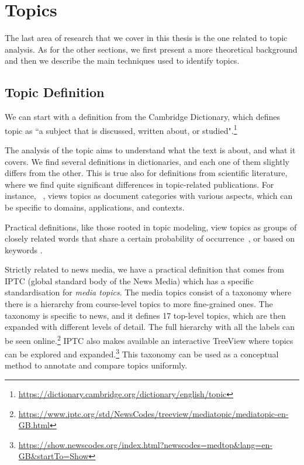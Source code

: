 \section{\statusgreen Topics}
\label{sec:lit_topics}

The last area of research that we cover in this thesis is the one related to topic analysis.
As for the other sections, we first present a more theoretical background and then we describe the main techniques used to identify topics.


\subsection{\statusgreen Topic Definition}
\label{sec:lit_topics_def}

We can start with a definition from the Cambridge Dictionary, which defines topic as ``a subject that is discussed, written about, or studied".\footnote{\url{https://dictionary.cambridge.org/dictionary/english/topic}}

The analysis of the topic aims to understand what the text is about, and what it covers. We find several definitions in dictionaries, and each one of them slightly differs from the other.
This is true also for definitions from scientific literature, where we find quite significant differences in topic-related publications.
For instance, %
~\citet{ding2011community}, views topics as document categories with various aspects, which can be specific to domains, applications, and contexts.

Practical definitions, like those rooted in topic modeling, view topics as groups of closely related words that share a certain probability of occurrence~\citep{blei2003latent,blei2006correlated,blei2012probabilistic}, or based on keywords \citep{erten2004exploring,decker2007detection}.


Strictly related to news media, we have a practical definition that comes from IPTC (global standard body of the News Media) which has a specific standardisation for \emph{media topics}.
The media topics consist of a taxonomy where there is a hierarchy from course-level topics to more fine-grained ones.
The taxonomy is specific to news, and it defines 17 top-level topics, which are then expanded with different levels of detail.
The full hierarchy with all the labels can be seen online.\footnote{\url{https://www.iptc.org/std/NewsCodes/treeview/mediatopic/mediatopic-en-GB.html}}
IPTC also makes available an interactive TreeView where topics can be explored and expanded.\footnote{\url{https://show.newscodes.org/index.html?newscodes=medtop&lang=en-GB&startTo=Show}}
This taxonomy can be used as a conceptual method to annotate and compare topics uniformly.

